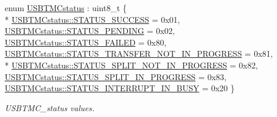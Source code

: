 \begin{DoxyCompactItemize}
enum \hyperlink{classmdt_usbtmc_control_transfer_a9deb98223593f6919b4ecbd87f7e375c}{U\-S\-B\-T\-M\-Cstatus} \-: uint8\-\_\-t \{ \\*
\hyperlink{classmdt_usbtmc_control_transfer_a9deb98223593f6919b4ecbd87f7e375ca47768f6d3d56f8455845fb093ab0cf0e}{U\-S\-B\-T\-M\-Cstatus\-::\-S\-T\-A\-T\-U\-S\-\_\-\-S\-U\-C\-C\-E\-S\-S} = 0x01, 
\hyperlink{classmdt_usbtmc_control_transfer_a9deb98223593f6919b4ecbd87f7e375ca767dde9d10dac1b1eaabbf0f6c51814c}{U\-S\-B\-T\-M\-Cstatus\-::\-S\-T\-A\-T\-U\-S\-\_\-\-P\-E\-N\-D\-I\-N\-G} = 0x02, 
\hyperlink{classmdt_usbtmc_control_transfer_a9deb98223593f6919b4ecbd87f7e375ca073697b2a5bf9563bc184f10e3db1511}{U\-S\-B\-T\-M\-Cstatus\-::\-S\-T\-A\-T\-U\-S\-\_\-\-F\-A\-I\-L\-E\-D} = 0x80, 
\hyperlink{classmdt_usbtmc_control_transfer_a9deb98223593f6919b4ecbd87f7e375cab566a1dbbf2f50dc50a8480fbd3f910c}{U\-S\-B\-T\-M\-Cstatus\-::\-S\-T\-A\-T\-U\-S\-\_\-\-T\-R\-A\-N\-S\-F\-E\-R\-\_\-\-N\-O\-T\-\_\-\-I\-N\-\_\-\-P\-R\-O\-G\-R\-E\-S\-S} = 0x81, 
\\*
\hyperlink{classmdt_usbtmc_control_transfer_a9deb98223593f6919b4ecbd87f7e375ca996fcc8912c879c4d09092d31980c972}{U\-S\-B\-T\-M\-Cstatus\-::\-S\-T\-A\-T\-U\-S\-\_\-\-S\-P\-L\-I\-T\-\_\-\-N\-O\-T\-\_\-\-I\-N\-\_\-\-P\-R\-O\-G\-R\-E\-S\-S} = 0x82, 
\hyperlink{classmdt_usbtmc_control_transfer_a9deb98223593f6919b4ecbd87f7e375cac1781e0d5317190cd79ca6d94295fad1}{U\-S\-B\-T\-M\-Cstatus\-::\-S\-T\-A\-T\-U\-S\-\_\-\-S\-P\-L\-I\-T\-\_\-\-I\-N\-\_\-\-P\-R\-O\-G\-R\-E\-S\-S} = 0x83, 
\hyperlink{classmdt_usbtmc_control_transfer_a9deb98223593f6919b4ecbd87f7e375ca01550706ae7ac85aaed4a54585736b16}{U\-S\-B\-T\-M\-Cstatus\-::\-S\-T\-A\-T\-U\-S\-\_\-\-I\-N\-T\-E\-R\-R\-U\-P\-T\-\_\-\-I\-N\-\_\-\-B\-U\-S\-Y} = 0x20
 \}
\begin{DoxyCompactList}\small\item\em U\-S\-B\-T\-M\-C\-\_\-status values. \end{DoxyCompactList}\end{DoxyCompactItemize}
